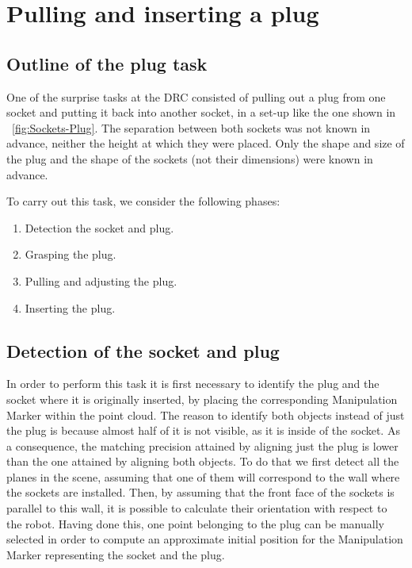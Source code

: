 \section{Pulling and inserting a plug}
	\label{sec:plug}
	
	\subsection{Outline of the plug task}
	
		One of the surprise tasks at the DRC consisted of pulling out a plug
		from one socket and putting it back into another socket, in a set-up like the one shown in
		\figurename~\ref{fig:Sockets-Plug}.
		The separation between both sockets was not known in advance, neither the height at which
		they were placed.
		Only the shape and size of the plug and the shape of the sockets (not their dimensions)
		were known in advance.
		
		To carry out this task, we consider the following phases:
		\begin{enumerate}
			\item Detection the socket and plug.
			\item Grasping the plug.
			\item Pulling and adjusting the plug.
			\item Inserting the plug.
		\end{enumerate}
	
	\subsection{Detection of the socket and plug}
		\label{sub:DetectionSocketPlug}
		
		In order to perform this task it is first necessary to identify the plug and the socket where
		it is originally inserted, by placing the corresponding Manipulation Marker within the point cloud.
		The reason to identify both objects instead of just the plug is because almost half of it
		is not visible, as it is inside of the socket.
		As a consequence, the matching precision attained by aligning just the plug is lower than the one
		attained by aligning both objects.
		To do that we first detect all the planes in the scene, assuming that one of them will correspond
		to the wall where the sockets are installed.
		Then, by assuming that the front face of the sockets is parallel to this wall, it is possible
		to calculate their orientation with respect to the robot.
		Having done this, one point belonging to the plug can be manually selected in order to compute
		an approximate initial position for the Manipulation Marker representing the socket and the plug.
		
